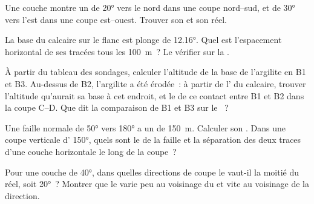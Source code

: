 \begin{exercise}[$\star\star$]\label{exo:b1:cross-sections:6}
Une couche montre un  de \ang{20} vers le nord dans une coupe
nord--sud, et de \ang{30} vers l'est dans une coupe est--ouest. Trouver son  et son  réel.
\end{exercise}

\begin{exercise}[$\star\star$]\label{exo:b1:cross-sections:7}
La base du calcaire sur le flanc est plonge de \ang{12.16}. Quel est l'espacement
horizontal de ses  tracées tous les \qty{100}{m}~? Le
vérifier sur la .
\end{exercise}

\begin{exercise}[$\star\star$]\label{exo:b1:cross-sections:8}
À partir du tableau des sondages, calculer l'altitude de la base de l'argilite en
B1 et B3. Au-dessus de B2, l'argilite a été érodée~: à partir de l' du calcaire, trouver l'altitude qu'aurait sa base à cet endroit, et le
 de ce contact entre B1 et B2 dans la coupe C--D. Que dit la
comparaison de B1 et B3 sur le ~?
\end{exercise}

\begin{exercise}[$\star\star$]\label{exo:b1:cross-sections:9}
Une faille normale de  \ang{50} vers \ang{180} a un  de
\qty{150}{m}. Calculer son . Dans une coupe verticale d'
\ang{150}, quels sont le  de la faille et la séparation des deux
traces d'une couche horizontale le long de la coupe~?
\end{exercise}

\begin{exercise}[$\star\star\star$]\label{exo:b1:cross-sections:10}
Pour une couche de  \ang{40}, dans quelles directions de coupe le  vaut-il la moitié du  réel, soit \ang{20}~? Montrer que le
 varie peu au voisinage du  et vite au voisinage
de la direction.
\end{exercise}

